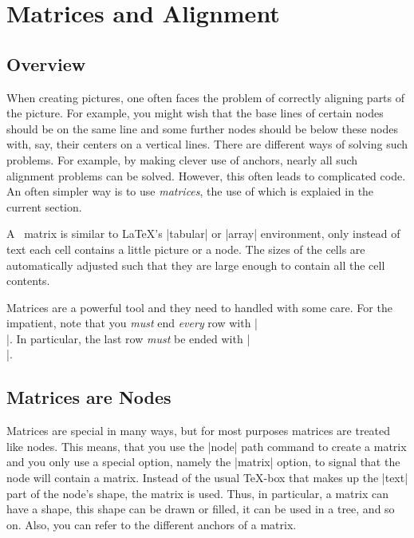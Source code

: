 %
%
%

\section{Matrices and Alignment}

\label{section-matrices}

\subsection{Overview}

When creating pictures, one often faces the problem of correctly
aligning parts of the picture. For example, you might wish that the
base lines of certain nodes should be on the same line and some
further nodes should be below these nodes with, say, their centers on
a vertical lines. There are different ways of solving such
problems. For example, by making clever use of anchors, nearly all
such alignment problems can be solved. However, this often leads to
complicated code. An often simpler way is to use \emph{matrices},
the use of which is explaied in the current section.

A \tikzname\ matrix is similar to \LaTeX's |{tabular}| or
|{array}| environment, only instead of text each cell contains a
little picture or a node. The sizes of the cells are automatically
adjusted such that they are large enough to contain all the cell
contents.

Matrices are a powerful tool and they need to handled with some care.
For the impatient, note that you \emph{must} end \emph{every} row with
|\\|. In particular, the last row \emph{must} be ended with |\\|.



\subsection{Matrices are Nodes}

Matrices are special in many ways, but for most purposes matrices are
treated like nodes. This means, that you use the |node| path command
to create a matrix and you only use a special option, namely the
|matrix| option, to signal that the node will contain a
matrix. Instead of the usual \TeX-box that makes up the |text| part of
the node's shape, the matrix is used. Thus, in particular, a matrix
can have a shape, this shape can be drawn or filled, it can be used in
a tree, and so on. Also, you can refer to the different anchors of a
matrix. 

